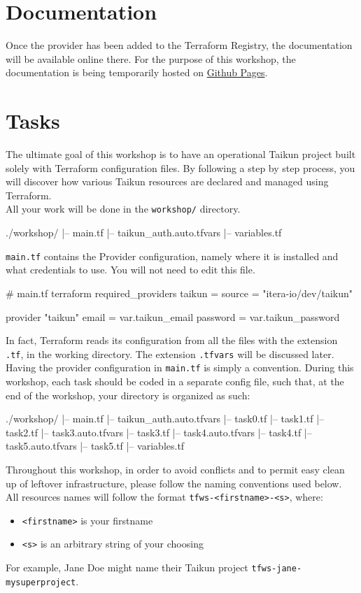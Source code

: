 \section{Documentation}
Once the provider has been added to the Terraform Registry, the documentation will be available online there.
For the purpose of this workshop, the documentation is being temporarily hosted on \href{https://intuinewin.github.io/taikun-docs/}{Github Pages}.

\section{Tasks}
The ultimate goal of this workshop is to have an operational Taikun project built solely with Terraform
configuration files.
By following a step by step process, you will discover how various Taikun
resources are declared and managed using Terraform.\\

All your work will be done in the \texttt{workshop/} directory.
\begin{raw}
./workshop/
|-- main.tf
|-- taikun_auth.auto.tfvars
|-- variables.tf
\end{raw}
\texttt{main.tf} contains the Provider configuration, namely where it is installed
and what credentials to use. You will not need to edit this file.
\begin{tf}
# main.tf
terraform {
  required_providers {
    taikun = {
      source = "itera-io/dev/taikun"
    }
  }
}

provider "taikun" {
  email    = var.taikun_email
  password = var.taikun_password
}
\end{tf}
In fact, Terraform reads its configuration from all the files with the extension \texttt{.tf},
in the working directory. The extension \texttt{.tfvars} will be discussed later.
Having the provider configuration in \texttt{main.tf} is simply a convention.
During this workshop, each task should be coded in a separate config file,
such that, at the end of the workshop, your directory is organized as such:
\begin{raw}
./workshop/
|-- main.tf
|-- taikun_auth.auto.tfvars
|-- task0.tf
|-- task1.tf
|-- task2.tf
|-- task3.auto.tfvars
|-- task3.tf
|-- task4.auto.tfvars
|-- task4.tf
|-- task5.auto.tfvars
|-- task5.tf
|-- variables.tf
\end{raw}

\begin{warn}
  Throughout this workshop, in order to avoid conflicts and
  to permit easy clean up of leftover infrastructure, please follow the naming conventions used below.\\

  All resources names will follow the format \texttt{tfws-<firstname>-<s>}, where:
  \begin{itemize}
    \item \texttt{<firstname>} is your firstname
    \item \texttt{<s>} is an arbitrary string of your choosing
  \end{itemize}
  For example, Jane Doe might name their Taikun project \texttt{tfws-jane-mysuperproject}.
\end{warn}

